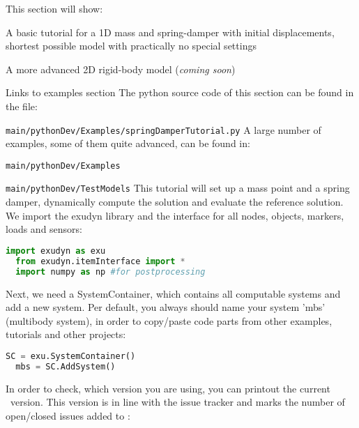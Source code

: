 

This section will show:
\bi
  \item A basic tutorial for a 1D mass and spring-damper with initial displacements, shortest possible model with practically no special settings
	\item A more advanced 2D rigid-body model ({\it coming soon})
	\item Links to examples section
\ei
%
The python source code of this section can be found in the file:
\bi
	\item[] \texttt{main/pythonDev/Examples/springDamperTutorial.py}
\ei
A large number of examples, some of them quite advanced, can be found in:
\bi
	\item[] \texttt{main/pythonDev/Examples}
	\item[] \texttt{main/pythonDev/TestModels}
\ei
This tutorial will set up a mass point and a spring damper, dynamically compute the solution and evaluate the reference solution.
\vspace{6pt}\\
%
We import the exudyn library and the interface for all nodes, objects, markers, loads and sensors:
\pythonstyle
\begin{lstlisting}[language=Python, firstnumber=3]
  import exudyn as exu
  from exudyn.itemInterface import *
  import numpy as np #for postprocessing
\end{lstlisting}
%
Next, we need a SystemContainer, which contains all computable systems and add a new system.
Per default, you always should name your system 'mbs' (multibody system), in order to copy/paste code parts from other examples, tutorials and other projects:
\begin{lstlisting}[language=Python, firstnumber=6]
  SC = exu.SystemContainer()
  mbs = SC.AddSystem()
\end{lstlisting}
%
In order to check, which version you are using, you can printout the current \codeName\ version. This version is in line with the issue tracker and marks the number of open/closed issues added to \codeName :
